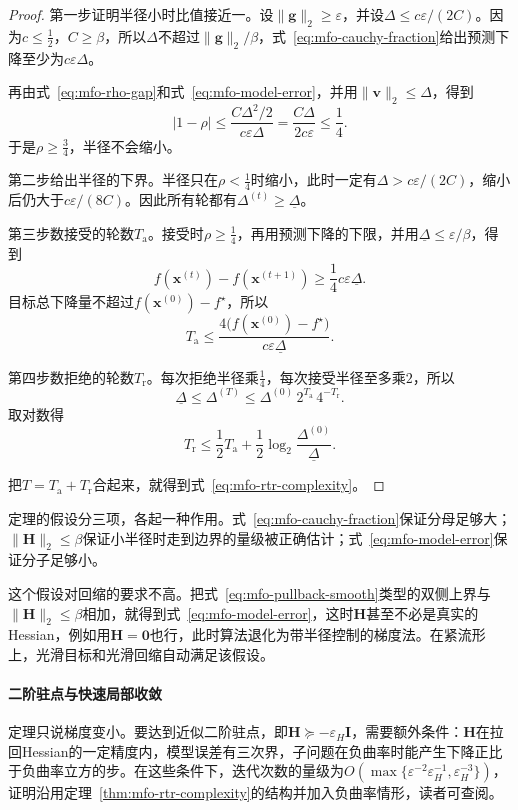 \begin{proof}
 第一步证明半径小时比值接近一。设$\lVert\bm{g}\rVert_2\geq\varepsilon$，并设$\Delta\leq c\varepsilon/(2C)$。因为$c\leq\tfrac12$，$C\geq\beta$，所以$\Delta$不超过$\lVert\bm{g}\rVert_2/\beta$，式~\eqref{eq:mfo-cauchy-fraction}给出预测下降至少为$c\varepsilon\Delta$。

 再由式~\eqref{eq:mfo-rho-gap}和式~\eqref{eq:mfo-model-error}，并用$\lVert\bm{v}\rVert_2\leq\Delta$，得到
 \[
  \lvert1-\rho\rvert\leq\frac{C\Delta^2/2}{c\varepsilon\Delta}=\frac{C\Delta}{2c\varepsilon}\leq\frac14.
 \]
 于是$\rho\geq\tfrac34$，半径不会缩小。

 第二步给出半径的下界。半径只在$\rho<\tfrac14$时缩小，此时一定有$\Delta>c\varepsilon/(2C)$，缩小后仍大于$c\varepsilon/(8C)$。因此所有轮都有$\Delta^{(t)}\geq\underline{\Delta}$。

 第三步数接受的轮数$T_{\mathrm{a}}$。接受时$\rho\geq\tfrac14$，再用预测下降的下限，并用$\underline{\Delta}\leq\varepsilon/\beta$，得到
 \[
  f(\bm{x}^{(t)})-f(\bm{x}^{(t+1)})\geq\frac14c\varepsilon\underline{\Delta}.
 \]
 目标总下降量不超过$f(\bm{x}^{(0)})-f^\star$，所以
 \[
  T_{\mathrm{a}}\leq\frac{4\bigl(f(\bm{x}^{(0)})-f^\star\bigr)}{c\varepsilon\underline{\Delta}}.
 \]

 第四步数拒绝的轮数$T_{\mathrm{r}}$。每次拒绝半径乘$\tfrac14$，每次接受半径至多乘$2$，所以
 \[
  \underline{\Delta}\leq\Delta^{(T)}\leq\Delta^{(0)}\,2^{T_{\mathrm{a}}}\,4^{-T_{\mathrm{r}}}.
 \]
 取对数得
 \[
  T_{\mathrm{r}}\leq\frac12T_{\mathrm{a}}+\frac12\log_2\frac{\Delta^{(0)}}{\underline{\Delta}}.
 \]

 把$T=T_{\mathrm{a}}+T_{\mathrm{r}}$合起来，就得到式~\eqref{eq:mfo-rtr-complexity}。
\end{proof}

定理的假设分三项，各起一种作用。式~\eqref{eq:mfo-cauchy-fraction}保证分母足够大；$\lVert\bm{H}\rVert_2\leq\beta$保证小半径时走到边界的量级被正确估计；式~\eqref{eq:mfo-model-error}保证分子足够小。

这个假设对回缩的要求不高。把式~\eqref{eq:mfo-pullback-smooth}类型的双侧上界与$\lVert\bm{H}\rVert_2\leq\beta$相加，就得到式~\eqref{eq:mfo-model-error}，这时$\bm{H}$甚至不必是真实的Hessian，例如用$\bm{H}=\bm{0}$也行，此时算法退化为带半径控制的梯度法。在紧流形上，光滑目标和光滑回缩自动满足该假设。

\paragraph{二阶驻点与快速局部收敛}
定理只说梯度变小。要达到近似二阶驻点，即$\bm{H}\succeq-\varepsilon_H\bm{I}$，需要额外条件：$\bm{H}$在拉回Hessian的一定精度内，模型误差有三次界，子问题在负曲率时能产生下降正比于负曲率立方的步。在这些条件下，迭代次数的量级为$O(\max\{\varepsilon^{-2}\varepsilon_H^{-1},\varepsilon_H^{-3}\})$，证明沿用定理~\ref{thm:mfo-rtr-complexity}的结构并加入负曲率情形，读者可查阅。

